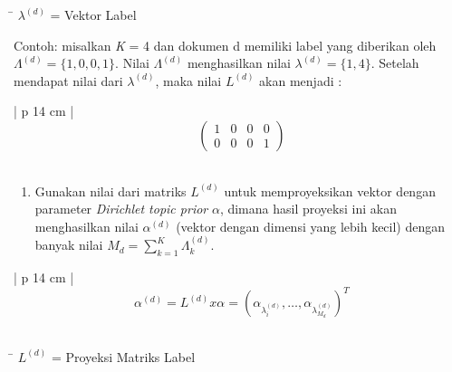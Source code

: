 \begin{enumerate}[nolistsep,leftmargin=0.5cm]
\begin{tabbing}[H]
\= \kill
\small{\hspace{60mm}$\lambda ^{(d)}$ = Vektor Label}\\
\end{tabbing}

Contoh: misalkan \textit{K} = 4 dan dokumen d memiliki label yang diberikan oleh $\Lambda ^{(d)}= \lbrace 1, 0, 0, 1\rbrace $. Nilai $\Lambda ^{(d)}$ menghasilkan nilai $\lambda ^{(d)}= \lbrace 1, 4\rbrace $. Setelah mendapat nilai dari $\lambda ^{(d)}$, maka nilai $L^{(d)}$ akan menjadi :

\begin{table}[H]
\footnotesize
\centering
\begin{adjustbox}{width=1\textwidth}
\begin{tabular}{| p {14 cm} |}
\hline
$$
\begin{pmatrix} 
1 & 0 & 0 & 0 \\
0 & 0 & 0 & 1 
\end{pmatrix}
$$\\
\hline
\end{tabular}
\end{adjustbox}
\end{table}
\end{enumerate}

\begin{enumerate}
\setcounter{enumi}{\thenumberedCntDA}
\item 
Gunakan nilai dari matriks $L^{(d)}$ untuk memproyeksikan vektor dengan parameter \textit{Dirichlet topic prior} \textit{$\alpha$}, dimana hasil proyeksi ini akan menghasilkan nilai $\alpha ^{(d)}$ (vektor dengan dimensi yang lebih kecil) dengan banyak nilai $M_{d}= \sum_{k=1}^{K}{\Lambda _{k}^{(d)}}$.
\setcounter{numberedCntDA}{\theenumi}
\end{enumerate}

\begin{table}[H]
\small
\centering
\begin{adjustbox}{width=1\textwidth}
\begin{tabular}{| p {14 cm} |}
\hline
$$
\alpha ^{(d)}= L^{(d)} x \alpha = (\alpha _{\lambda _{i}^{(d)}}, \ldots ,\alpha _{\lambda _{M_{d}}^{(d)}})^{T}
$$\\
\hline
\end{tabular}
\end{adjustbox}
\end{table}

\begin{tabbing}[H]
\= \kill
\small{\hspace{60mm}$L^{(d)}$ = Proyeksi Matriks Label}
\end{tabbing}

